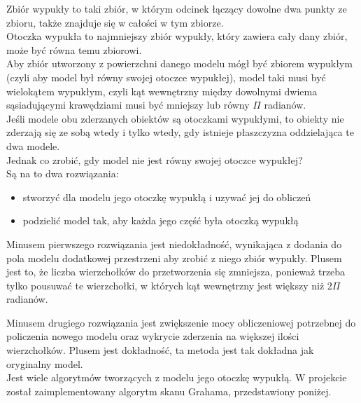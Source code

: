 \noindent Zbiór wypukły to taki zbiór, w którym odcinek łączący dowolne dwa punkty ze zbioru, także znajduje się w cało\'sci w tym zbiorze.\\
Otoczka wypukła to najmniejszy zbiór wypukły, który zawiera cały dany zbiór, może być równa temu zbiorowi.\\
Aby zbiór utworzony z powierzchni danego modelu mógł być zbiorem wypukłym (czyli aby model był równy swojej otoczce wypukłej), model taki musi być wielokątem wypukłym, czyli kąt wewnętrzny między dowolnymi dwiema sąsiadującymi krawędziami musi być mniejszy lub równy $\Pi$ radianów.\\
Je\'sli modele obu zderzanych obiektów są otoczkami wypukłymi, to obiekty nie zderzają się ze sobą wtedy i tylko wtedy, gdy istnieje płaszczyzna oddzielająca te dwa modele.\\
Jednak co zrobić, gdy model nie jest równy swojej otoczce wypukłej?\\
Są na to dwa rozwiązania:
\begin{itemize}
	\item stworzyć dla modelu jego otoczkę wypukłą i uzywać jej do obliczeń
	\item podzielić model tak, aby każda jego czę\'sć była otoczką wypukłą
\end{itemize}

Minusem pierwszego rozwiązania jest niedokładno\'sć, wynikająca z dodania do pola modelu dodatkowej przestrzeni aby zrobić z niego zbiór wypukły. Plusem jest to, że liczba wierzchołków do przetworzenia się zmniejsza, ponieważ trzeba tylko pousuwać te wierzchołki, w których kąt wewnętrzny jest większy niż $2\Pi$ radianów.

Minusem drugiego rozwiązania jest zwiększenie mocy obliczeniowej potrzebnej do policzenia nowego modelu oraz wykrycie zderzenia na większej ilo\'sci wierzchołków. Plusem jest dokładno\'sć, ta metoda jest tak dokładna jak oryginalny model.\\

Jest wiele algorytmów tworzących z modelu jego otoczkę wypukłą. W projekcie został zaimplementowany algorytm skanu Grahama, przedstawiony poniżej.\\

